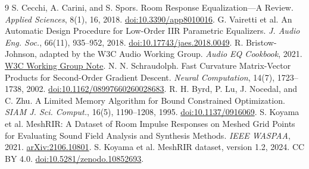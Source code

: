 \documentclass[11pt,letterpaper]{article}
\begin{document}
\begin{thebibliography}{9}
\small
\setlength{\itemsep}{0pt}
\setlength{\parskip}{0pt}
 S. Cecchi, A. Carini, and S. Spors.
Room Response Equalization---A Review. \emph{Applied Sciences}, 8(1), 16,
2018. \href{https://doi.org/10.3390/app8010016}{doi:10.3390/app8010016}.
 G. Vairetti et al. An Automatic Design Procedure for
Low-Order IIR Parametric Equalizers. \emph{J. Audio Eng. Soc.},
66(11), 935--952, 2018.
\href{https://doi.org/10.17743/jaes.2018.0049}{doi:10.17743/jaes.2018.0049}.
 R. Bristow-Johnson, adapted by the W3C Audio Working Group.
\emph{Audio EQ Cookbook}, 2021.
\href{https://www.w3.org/TR/audio-eq-cookbook/}{W3C Working Group Note}.
 N. N. Schraudolph. Fast Curvature Matrix-Vector
Products for Second-Order Gradient Descent. \emph{Neural Computation},
14(7), 1723--1738, 2002.
\href{https://doi.org/10.1162/08997660260028683}{doi:10.1162/08997660260028683}.
 R. H. Byrd, P. Lu, J. Nocedal, and C. Zhu.
A Limited Memory Algorithm for Bound Constrained Optimization.
\emph{SIAM J. Sci. Comput.}, 16(5), 1190--1208, 1995.
\href{https://doi.org/10.1137/0916069}{doi:10.1137/0916069}.
 S. Koyama et al. MeshRIR: A Dataset of Room Impulse Responses
on Meshed Grid Points for Evaluating Sound Field Analysis and Synthesis
Methods. \emph{IEEE WASPAA}, 2021.
\href{https://arxiv.org/abs/2106.10801}{arXiv:2106.10801}.
 S. Koyama et al. MeshRIR dataset, version 1.2, 2024.
CC BY 4.0. \href{https://doi.org/10.5281/zenodo.10852693}{doi:10.5281/zenodo.10852693}.
\end{thebibliography}
\end{document}

